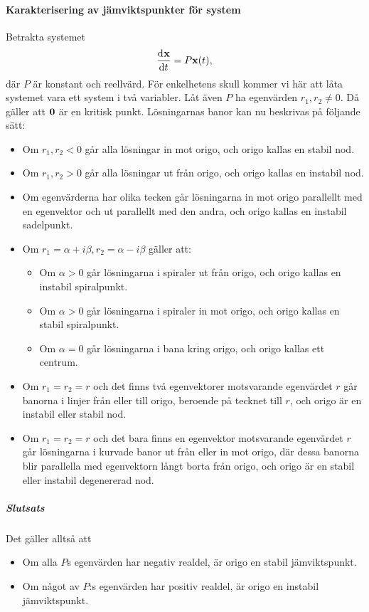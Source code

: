 \paragraph{Karakterisering av jämviktspunkter för system}
Betrakta systemet
\begin{align*}
	\dv[]{\vb{x}}{t} (t) = P\vb{x}(t),
\end{align*}
där $P$ är konstant och reellvärd. För enkelhetens skull kommer vi här att låta systemet vara ett system i två variabler. Låt även $P$ ha egenvärden $r_{1}, r_{2}\neq 0$. Då gäller att $\vb{0}$ är en kritisk punkt. Lösningarnas banor kan nu beskrivas på följande sätt:
\begin{itemize}
	\item Om $r_{1}, r_{2} < 0$ går alla lösningar in mot origo, och origo kallas en stabil nod.
	\item Om $r_{1}, r_{2} > 0$ går alla lösningar ut från origo, och origo kallas en instabil nod.
	\item Om egenvärderna har olika tecken går lösningarna in mot origo parallellt med en egenvektor och ut parallellt med den andra, och origo kallas en instabil sadelpunkt.
	\item Om $r_{1} = \alpha + i\beta, r_{2} = \alpha - i\beta$ gäller att:
	\begin{itemize}
		\item Om $\alpha > 0$ går lösningarna i spiraler ut från origo, och origo kallas en instabil spiralpunkt.
		\item Om $\alpha > 0$ går lösningarna i spiraler in mot origo, och origo kallas en stabil spiralpunkt.
		\item Om $\alpha = 0$ går lösningarna i bana kring origo, och origo kallas ett centrum.
	\end{itemize}
	\item Om $r_{1} = r_{2} = r$ och det finns två egenvektorer motsvarande egenvärdet $r$ går banorna i linjer från eller till origo, beroende på tecknet till $r$, och origo är en instabil eller stabil nod.
	\item Om $r_{1} = r_{2} = r$ och det bara finns en egenvektor motsvarande egenvärdet $r$ går lösningarna i kurvade banor ut från eller in mot origo, där dessa banorna blir parallella med egenvektorn långt borta från origo, och origo är en stabil eller instabil degenererad nod.
\end{itemize}

\subparagraph{Slutsats}
Det gäller alltså att
\begin{itemize}
	\item Om alla $P$s egenvärden har negativ realdel, är origo en stabil jämviktspunkt.
	\item Om något av $P$:s egenvärden har positiv realdel, är origo en instabil jämviktspunkt.
\end{itemize}

